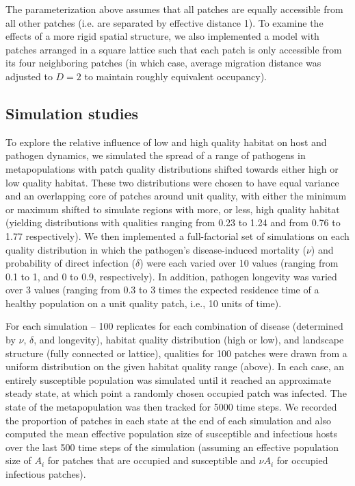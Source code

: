 \documentclass{article}
\begin{document}
The parameterization above assumes that all patches are equally accessible from all other patches (i.e. are separated by effective distance 1).  To examine the effects of a more rigid spatial structure, we also implemented a model with patches arranged in a square lattice such that each patch is only accessible from its four neighboring patches (in which case, average migration distance was adjusted to $D = 2$ to maintain roughly equivalent occupancy).  

\subsection{Simulation studies}

To explore the relative influence of low and high quality habitat on host and pathogen dynamics, we simulated the spread of a range of pathogens in metapopulations with patch quality distributions shifted towards either high or low quality habitat.
These two distributions were chosen to have equal variance and an overlapping core of patches around unit quality, with either the minimum or maximum shifted to simulate regions with more, or less, high quality habitat (yielding distributions with qualities ranging from 0.23 to 1.24 and from 0.76 to 1.77 respectively).  
We then implemented a full-factorial set of simulations on each quality distribution in which the pathogen's disease-induced mortality ($\nu$) and probability of direct infection ($\delta$) were each varied over 10 values (ranging from 0.1 to 1, and 0 to 0.9, respectively).  In addition, pathogen longevity was varied over 3 values (ranging from 0.3 to 3 times the expected residence time of a healthy population on a unit quality patch, i.e., 10 units of time).

For each simulation -- 100 replicates for each combination of disease (determined by $\nu$, $\delta$, and longevity), habitat quality distribution (high or low), and landscape structure (fully connected or lattice), qualities for 100 patches were drawn from a uniform distribution on the given habitat quality range (above). In each case, an entirely susceptible population was simulated until it reached an approximate steady state, at which point a randomly chosen occupied patch was infected.  The state of the metapopulation was then tracked for 5000 time steps.  We recorded the proportion of patches in each state at the end of each simulation and also computed the mean effective population size of susceptible and infectious hosts over the last 500 time steps of the simulation (assuming an effective population size of $A_i$ for patches that are occupied and susceptible and $\nu A_i$ for occupied infectious patches).    
\end{document}

